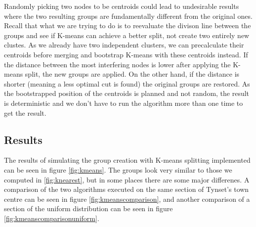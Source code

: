 Randomly picking two nodes to be centroids could lead to undesirable results where the two resulting groups are fundamentally different from the original ones.
Recall that what we are trying to do is to reevaluate the divison line between the groups and see if K-means can achieve a better split, not create two entirely new clustes. As we already have
two independent clusters, we can precalculate their centroids before merging and bootstrap K-means with these centroids instead. 
If the distance between the most interfering nodes is lower after applying the K-means split, the new groups are applied. On the other hand, if the distance is shorter
(meaning a less optimal cut is found) the original groups are restored. As the bootstrapped position of the centroids is planned and not random,
the result is deterministic and we don't have to run the algorithm more than one time to get the result. 


\subsection{Results}
The results of simulating the group creation with K-means splitting implemented can be seen in figure \ref{fig:kmeans}. The groups look very similar to those we computed in \ref{fig:knearest}, but
in some places there are some major differenes. A comparison of the two algorithms executed on the same section of Tynset's town centre can be seen in figure \ref{fig:kmeanscomparison}, and another
comparison of a section of the uniform distribution can be seen in figure \ref{fig:kmeanscomparisonuniform}. 

